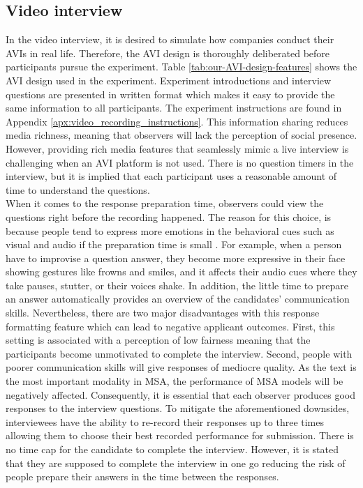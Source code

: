 \subsection{Video interview}
\label{sec:video_interview}
In the video interview, it is desired to simulate how companies conduct their AVIs in real life. Therefore, the AVI design is thoroughly deliberated before participants pursue the experiment. Table \ref{tab:our-AVI-design-features} shows the AVI design used in the experiment. Experiment introductions and interview questions are presented in written format which makes it easy to provide the same information to all participants. The experiment instructions are found in Appendix \ref{apx:video_recording_instructions}. This information sharing reduces media richness, meaning that observers will lack the perception of social presence. However, providing rich media features that seamlessly mimic a live interview is challenging when an AVI platform is not used. There is no question timers in the interview, but it is implied that each participant uses a reasonable amount of time to understand the questions. \\

When it comes to the response preparation time, observers could view the questions right before the recording happened. The reason for this choice, is because people tend to express more emotions in the behavioral cues such as visual and audio if the preparation time is small \cite{video-interview1-LUKACIK2022100789}. For example, when a person have to improvise a question answer, they become more expressive in their face showing gestures like frowns and smiles, and it affects their audio cues where they take pauses, stutter, or their voices shake. In addition, the little time to prepare an answer automatically provides an overview of the candidates' communication skills. Nevertheless, there are two major disadvantages with this response formatting feature which can lead to negative applicant outcomes. First, this setting is associated with a perception of low fairness meaning that the participants become unmotivated to complete the interview. Second, people with poorer communication skills will give responses of mediocre quality. As the text is the most important modality in MSA, the performance of MSA models will be negatively affected. Consequently, it is essential that each observer produces good responses to the interview questions. To mitigate the aforementioned downsides, interviewees have the ability to re-record their responses up to three times allowing them to choose their best recorded performance for submission. There is no time cap for the candidate to complete the interview. However, it is stated that they are supposed to complete the interview in one go reducing the risk of people prepare their answers in the time between the responses. \\

